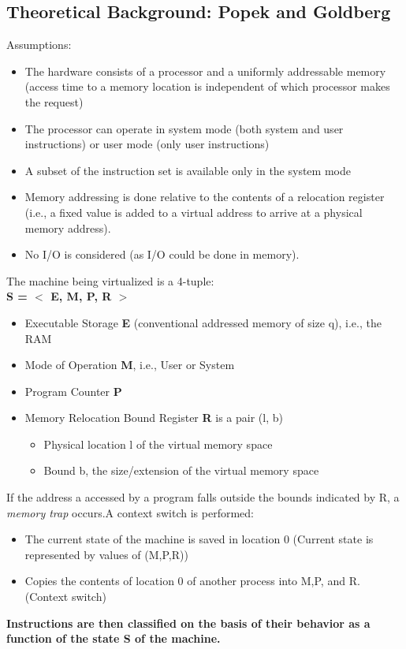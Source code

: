 \documentclass[10pt, oneside]{article}
\begin{document}
\subsection{Theoretical Background: Popek and Goldberg}
Assumptions:
\begin{itemize}
    \item The hardware consists of a processor and a uniformly addressable memory (access time to a memory location is independent of which processor makes the request)
    \item The processor can operate in system mode (both system and user instructions) or user mode (only user instructions)
    \item A subset of the instruction set is available only in the system mode
    \item Memory addressing is done relative to the contents of a relocation register (i.e., a fixed value is added to a virtual address to arrive at a physical memory address).
    \item No I/O is considered (as I/O could be done in memory).
\end{itemize}The machine being virtualized is a 4-tuple:\\
{\bf S = $<$ E, M, P, R $>$}\begin{itemize}
    \item Executable Storage {\bf E} (conventional addressed memory of size q), i.e., the RAM
    \item Mode of Operation {\bf M}, i.e., User or System
    \item Program Counter {\bf P}
    \item Memory Relocation Bound Register {\bf R} is a pair (l, b)\begin{itemize}
        \item Physical location l of the virtual memory space
        \item Bound b, the size/extension of the virtual memory space
    \end{itemize}
\end{itemize}If the address a accessed by a program falls outside the bounds indicated by R, a {\sl memory trap} occurs.A context switch is performed:\begin{itemize}
    \item The current state of the machine is saved in location 0 (Current state is represented by values of (M,P,R))
    \item Copies the contents of location 0 of another process into M,P, and R. (Context switch)
\end{itemize}{\bf Instructions are then classified on the basis of their behavior as a function of the state S of the machine.}\\
\end{document}
